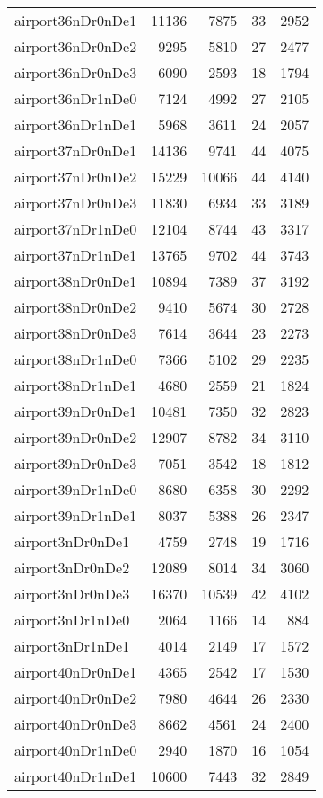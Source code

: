\begin{longtable}{lrrrr}
airport36nDr0nDe1 & 11136 & 7875 & 33 & 2952 \\
airport36nDr0nDe2 & 9295 & 5810 & 27 & 2477 \\
airport36nDr0nDe3 & 6090 & 2593 & 18 & 1794 \\
airport36nDr1nDe0 & 7124 & 4992 & 27 & 2105 \\
airport36nDr1nDe1 & 5968 & 3611 & 24 & 2057 \\
airport37nDr0nDe1 & 14136 & 9741 & 44 & 4075 \\
airport37nDr0nDe2 & 15229 & 10066 & 44 & 4140 \\
airport37nDr0nDe3 & 11830 & 6934 & 33 & 3189 \\
airport37nDr1nDe0 & 12104 & 8744 & 43 & 3317 \\
airport37nDr1nDe1 & 13765 & 9702 & 44 & 3743 \\
airport38nDr0nDe1 & 10894 & 7389 & 37 & 3192 \\
airport38nDr0nDe2 & 9410 & 5674 & 30 & 2728 \\
airport38nDr0nDe3 & 7614 & 3644 & 23 & 2273 \\
airport38nDr1nDe0 & 7366 & 5102 & 29 & 2235 \\
airport38nDr1nDe1 & 4680 & 2559 & 21 & 1824 \\
airport39nDr0nDe1 & 10481 & 7350 & 32 & 2823 \\
airport39nDr0nDe2 & 12907 & 8782 & 34 & 3110 \\
airport39nDr0nDe3 & 7051 & 3542 & 18 & 1812 \\
airport39nDr1nDe0 & 8680 & 6358 & 30 & 2292 \\
airport39nDr1nDe1 & 8037 & 5388 & 26 & 2347 \\
airport3nDr0nDe1 & 4759 & 2748 & 19 & 1716 \\
airport3nDr0nDe2 & 12089 & 8014 & 34 & 3060 \\
airport3nDr0nDe3 & 16370 & 10539 & 42 & 4102 \\
airport3nDr1nDe0 & 2064 & 1166 & 14 & 884 \\
airport3nDr1nDe1 & 4014 & 2149 & 17 & 1572 \\
airport40nDr0nDe1 & 4365 & 2542 & 17 & 1530 \\
airport40nDr0nDe2 & 7980 & 4644 & 26 & 2330 \\
airport40nDr0nDe3 & 8662 & 4561 & 24 & 2400 \\
airport40nDr1nDe0 & 2940 & 1870 & 16 & 1054 \\
airport40nDr1nDe1 & 10600 & 7443 & 32 & 2849 \\

\end{longtable}
